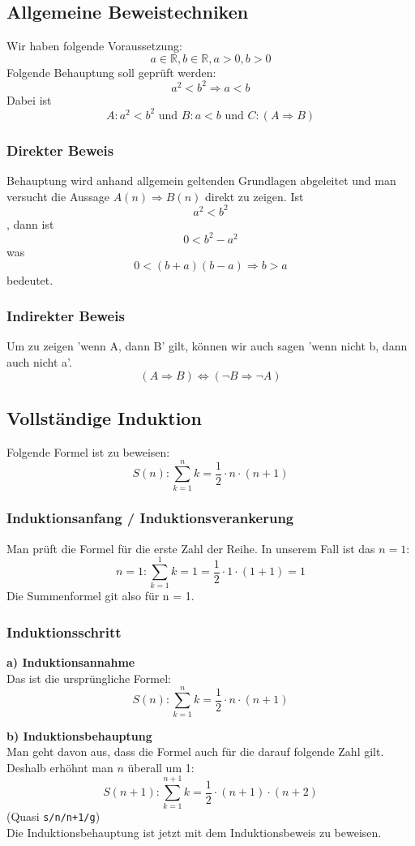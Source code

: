 \subsection{Allgemeine Beweistechniken}
Wir haben folgende Voraussetzung:
  \[ a \in \mathbb{R}, b \in \mathbb{R}, a > 0, b > 0 \]
  Folgende Behauptung soll geprüft werden:
  \[ a^2 < b^2 \Rightarrow a < b \]
  Dabei ist
  \[ A: a^2 < b^2 \text{ und } B: a < b \text{ und } C: (A \Rightarrow B) \]
  \subsubsection{Direkter Beweis}
  Behauptung wird anhand allgemein geltenden Grundlagen abgeleitet und man versucht die Aussage $A(n) \Rightarrow B(n)$ direkt zu zeigen.
  Ist \[a^2 < b^2\], dann ist \[0 < b^2 - a^2\] was \[0 < (b + a)(b - a)
  \Rightarrow b > a\] bedeutet.
  \subsubsection{Indirekter Beweis}
  Um zu zeigen 'wenn A, dann B' gilt, können wir auch sagen 'wenn nicht b, dann auch nicht a'.
  \[ (A \Rightarrow B) \Leftrightarrow (\neg B \Rightarrow \neg A) \]

\subsection{Vollständige Induktion}
Folgende Formel ist zu beweisen:
\[ S(n): \sum\limits_{k=1}^n k = \frac{1}{2} \cdot n \cdot (n + 1)\]
\subsubsection{Induktionsanfang / Induktionsverankerung}
Man prüft die Formel für die erste Zahl der Reihe. In unserem Fall ist
das $n = 1$:
\[ n = 1: \sum\limits_{k=1}^1 k = 1 = \frac{1}{2} \cdot 1 \cdot (1 + 1) = 1\]
Die Summenformel git also für n = 1.

\subsubsection{Induktionsschritt}
\textbf{a) Induktionsannahme} \\
Das ist die ursprüngliche Formel:
\[ S(n): \sum\limits_{k=1}^n k = \frac{1}{2} \cdot n \cdot (n + 1)\]

\textbf{b) Induktionsbehauptung} \\
Man geht davon aus, dass die Formel auch für die darauf folgende Zahl
gilt. Deshalb erhöhnt man $n$ überall um 1:
 \[ S(n + 1): \sum\limits_{k=1}^{n+1} k = \frac{1}{2} \cdot (n + 1) \cdot (n + 2)\]
(Quasi \texttt{s/n/n+1/g}) \\
Die Induktionsbehauptung ist jetzt mit dem Induktionsbeweis zu beweisen.


